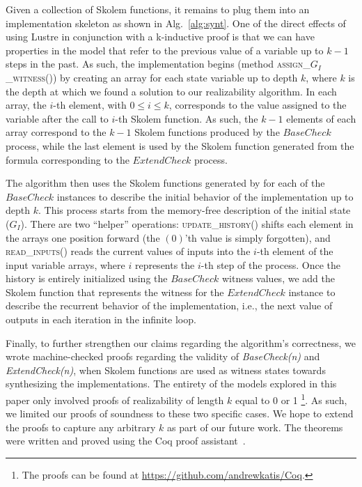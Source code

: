 Given a collection of Skolem functions, it remains to plug them into
an implementation skeleton as shown in Alg.~\ref{alg:synt}. One of the
direct effects of using Lustre in conjunction with a k-inductive proof
is that we can have properties in the model that refer to the
previous value of a variable up to $k-1$ steps in the past. As such,
the implementation begins (method \textsc{assign\_$G_{I}$\_witness()})
by creating an array for each state variable up to depth $k$, where
$k$ is the depth at which we found a solution to our realizability
algorithm. In each array, the $i$-th element, with $0\leq i \leq k$,
corresponds to the value assigned to the variable after the call to
$i$-th Skolem function. As such, the $k-1$ elements of each array
correspond to the $k-1$ Skolem functions produced by the
$\mathit{BaseCheck}$ process, while the last element is used by the
Skolem function generated from the formula corresponding to the
$\mathit{ExtendCheck}$ process.

The algorithm then uses the Skolem functions generated by \aeval for each
of the $\mathit{BaseCheck}$ instances to describe the initial behavior of
the implementation up to depth $k$.  This process starts from the memory-free
description of the initial state ($G_I$).
There are two ``helper'' operations:
\textsc{update\_history()} shifts each element in the arrays one position
forward (the $(0)$'th value is simply forgotten), and \textsc{read\_inputs()} reads the
current values of inputs into the $i$-th element of the input variable arrays,
where $i$ represents the $i$-th step of the process.
Once the history is entirely initialized using the $\mathit{BaseCheck}$ witness values,
we add the Skolem function that represents the witness for the
$\mathit{ExtendCheck}$ instance to describe the recurrent behavior of the implementation, i.e.,
the next value of outputs in each iteration in the infinite loop.

Finally, to further strengthen our claims regarding the algorithm's
correctness, we wrote machine-checked proofs regarding the validity of \textit{BaseCheck(n)} and
\textit{ExtendCheck(n)}, when Skolem functions are used as witness states
towards synthesizing the implementations. The entirety of the models explored in
this paper only involved proofs of realizability of length $k$ equal to 0 or
1%
\footnote{The proofs can be found at \url{https://github.com/andrewkatis/Coq}.}.
As such, we limited our proofs of soundness to these two specific cases. We hope
to extend the proofs to capture any arbitrary $k$ as part of our future work.
The theorems were written and proved using the Coq proof
assistant~\cite{Coqmanual}.

